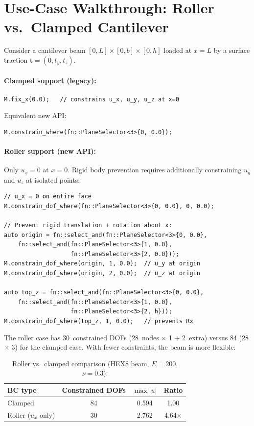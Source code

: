 \section{Use-Case Walkthrough: Roller vs.\ Clamped Cantilever}
\label{sec:bc-roller}

Consider a cantilever beam $[0,L]\times[0,b]\times[0,h]$ loaded at
$x = L$ by a surface traction $\mathbf{t} = (0, t_y, t_z)$.

\paragraph{Clamped support (legacy):}
\begin{lstlisting}
M.fix_x(0.0);   // constrains u_x, u_y, u_z at x=0
\end{lstlisting}
Equivalent new API:
\begin{lstlisting}
M.constrain_where(fn::PlaneSelector<3>{0, 0.0});
\end{lstlisting}

\paragraph{Roller support (new API):}
Only $u_x = 0$ at $x = 0$.  Rigid body prevention requires additionally
constraining $u_y$ and $u_z$ at isolated points:
\begin{lstlisting}
// u_x = 0 on entire face
M.constrain_dof_where(fn::PlaneSelector<3>{0, 0.0}, 0, 0.0);

// Prevent rigid translation + rotation about x:
auto origin = fn::select_and(fn::PlaneSelector<3>{0, 0.0},
    fn::select_and(fn::PlaneSelector<3>{1, 0.0},
                   fn::PlaneSelector<3>{2, 0.0}));
M.constrain_dof_where(origin, 1, 0.0);  // u_y at origin
M.constrain_dof_where(origin, 2, 0.0);  // u_z at origin

auto top_z = fn::select_and(fn::PlaneSelector<3>{0, 0.0},
    fn::select_and(fn::PlaneSelector<3>{1, 0.0},
                   fn::PlaneSelector<3>{2, h}));
M.constrain_dof_where(top_z, 1, 0.0);   // prevents Rx
\end{lstlisting}

The roller case has 30~constrained DOFs (28~nodes $\times$ 1 + 2~extra)
versus 84 (28 $\times$ 3) for the clamped case.  With fewer constraints,
the beam is more flexible:

\begin{table}[ht]
\centering\small
\caption{Roller vs.\ clamped comparison (HEX8 beam, $E=200$, $\nu=0.3$).}
\label{tab:roller-clamped}
\begin{tabular}{lccc}
\toprule
\textbf{BC type} & \textbf{Constrained DOFs} & $\max|u|$ & \textbf{Ratio} \\
\midrule
Clamped & 84 & 0.594 & 1.00 \\
Roller ($u_x$ only) & 30 & 2.762 & 4.64$\times$ \\
\bottomrule
\end{tabular}
\end{table}

